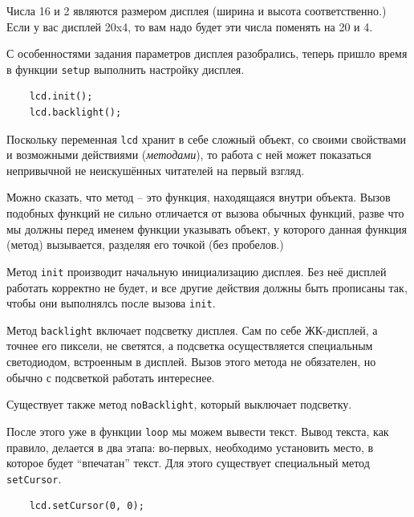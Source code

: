 \documentclass[../sparc.tex]{subfiles}
\begin{document}
Числа 16 и 2 являются размером дисплея (ширина и высота соответственно.)  Если у
вас дисплей 20x4, то вам надо будет эти числа поменять на 20 и 4.

С особенностями задания параметров дисплея разобрались, теперь пришло время в
функции \texttt{setup} выполнить настройку дисплея.

\begin{listing}[ht]
  \begin{verbatim}
    lcd.init();
    lcd.backlight();
  \end{verbatim}
  \caption{Код инициализации ЖК-дисплея.}
  \label{listing:game-dev-lcd-init}
\end{listing}

Поскольку переменная \texttt{lcd} хранит в себе сложный объект, со своими
свойствами и возможными действиями (\emph{методами}), то работа с ней может показаться
непривычной не неискушённых читателей на первый взгляд.

Можно сказать, что \gls{метод} -- это функция, находящаяся внутри объекта.
Вызов подобных функций не сильно отличается от вызова обычных функций, разве что
мы должны перед именем функции указывать объект, у которого данная функция
(метод) вызывается, разделяя его точкой (без пробелов.)

Метод \texttt{init} производит начальную инициализацию дисплея.  Без неё дисплей
работать корректно не будет, и все другие действия должны быть прописаны так,
чтобы они выполнялсь после вызова \texttt{init}.

Метод \texttt{backlight} включает подсветку дисплея.  Сам по себе ЖК-дисплей, а
точнее его пиксели, не светятся, а подсветка осуществляется специальным
светодиодом, встроенным в дисплей.  Вызов этого метода не обязателен, но обычно
с подсветкой работать интереснее.

Существует также метод \texttt{noBacklight}, который выключает подсветку.

После этого уже в функции \texttt{loop} мы можем вывести текст.  Вывод текста,
как правило, делается в два этапа: во-первых, необходимо установить место, в
которое будет ``впечатан'' текст.  Для этого существует специальный метод
\texttt{setCursor}.

\begin{listing}[ht]
  \begin{verbatim}
    lcd.setCursor(0, 0);
  \end{verbatim}
  \caption{Код установки позиции курсора ЖК-дисплея.}
  \label{listing:game-dev-lcd-set-cursor}
\end{listing}
\end{document}
